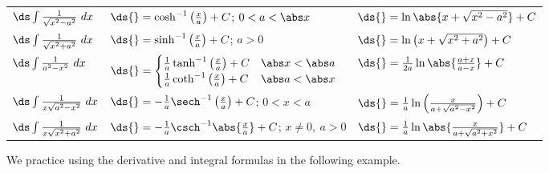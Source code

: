 \setboxwidth{120pt}
{%
\begin{anywhereenum}
\renewcommand{\arraystretch}{2.5}
\begin{tabular}{lll}
\item $\ds\int\frac1{\sqrt{x^2-a^2}}\ dx$ & $\ds{}=\cosh^{-1}\left(\frac xa\right)+C$; $0<a<\abs x$ & $\ds{}=\ln\abs{x+\sqrt{x^2-a^2}}+C$ \\
\item $\ds\int\frac1{\sqrt{x^2+a^2}}\ dx$ & $\ds{}=\sinh^{-1}\left(\frac xa\right)+C$; $a>0$ & $\ds{}=\ln\left(x+\sqrt{x^2+a^2}\right)+C$ \\
\item $\ds\int\frac1{a^2-x^2}\ dx$ & $\ds{}=\begin{cases}
\frac1a\tanh^{-1}\left(\frac xa\right)+C & \abs x<\abs a \\
\frac1a\coth^{-1}\left(\frac xa\right)+C & \abs a<\abs x
\end{cases}$ & $\ds{}=\frac1{2a}\ln\abs{\frac{a+x}{a-x}}+C$ \\
\item $\ds\int\frac1{x\sqrt{a^2-x^2}}\ dx$ & $\ds{}=-\frac1a\sech^{-1}\left(\frac xa\right)+C$; $0<x<a$ & $\ds{}=\frac1a\ln\left(\frac{x}{a+\sqrt{a^2-x^2}}\right)+C$ \\
\item $\ds\int\frac1{x\sqrt{x^2+a^2}}\ dx$ & $\ds{}=-\frac1a\csch^{-1}\abs{\frac xa}+C$; $x\neq 0,\ a>0$ & $\ds{}=\frac1a\ln\abs{\frac{x}{a+\sqrt{a^2+x^2}}}+C$
\end{tabular}
\end{anywhereenum}}

We practice using the derivative and integral formulas in the following example.

